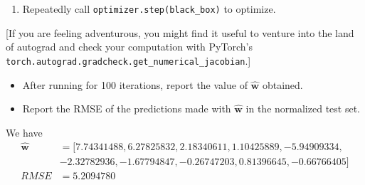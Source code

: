 \documentclass[submit]{harvardml}
\begin{document}
\begin{problem}[14pts]
\begin{enumerate}
\begin{verbatim}
    ...

    # Set the gradient of the variable.
    weights.grad = Tensor({numpy})

    return {objective}
\end{verbatim}

\item Repeatedly call \texttt{optimizer.step(black\_box)} to optimize.

\end{enumerate}

[If you are feeling adventurous, you might find it useful to venture
into the land of autograd and check your computation with PyTorch's
\texttt{torch.autograd.gradcheck.get\_numerical\_jacobian}.]

\begin{itemize}
\item After running for 100 iterations, report the value of $\hat{\mathbf{w}}$ obtained.
\item Report the RMSE of the predictions made with $\hat{\mathbf{w}}$ in the normalized test set.
\end{itemize}
\vspace{0.1cm}

\end{problem}

We have
\begin{align*}
\hat{\mathbf{w}} 
&= [ 7.74341488, 6.27825832,  2.18340611,  1.10425889, -5.94909334, \\ & -2.32782936, -1.67794847, -0.26747203,  0.81396645, -0.66766405] \\
RMSE &= 5.2094780
\end{align*}
\end{document}
